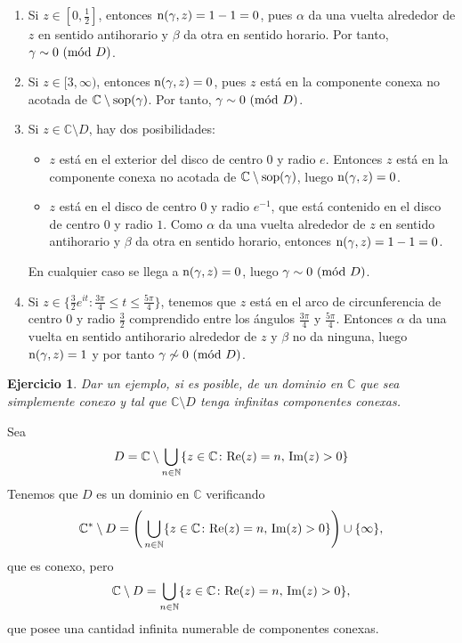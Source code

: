 \documentclass[11pt]{report}
\makeatletter
\renewenvironment{proof}[1][\proofname]{\par
  \pushQED{\qed}%
  \normalfont \topsep\z@skip %
  \trivlist
  \item[\hskip\labelsep
        \itshape
    #1\@addpunct{.}]\ignorespaces
}{%
  \popQED\endtrivlist\@endpefalse
}
\newcommand{\N}{\mathbb N}
\newcommand{\C}{\mathbb C}
\newtheorem{ejercicio}{Ejercicio}
\makeatother
\begin{document}
\begin{proof}
  \hfill
  \begin{enumerate}
    \item Si $z \in [0,\frac{1}{2}]$, entonces $\textup{n}(\gamma,z) = 1-1 = 0$, pues $\alpha$ da una vuelta alrededor de $z$ en sentido antihorario y $\beta$ da otra en sentido horario. Por tanto, $\gamma \sim 0 \ (\textup{mód } D)$.
    \item Si $z \in [3,\infty)$, entonces $\textup{n}(\gamma,z) = 0$, pues $z$ está en la componente conexa no acotada de $\C \setminus \textup{sop}(\gamma)$. Por tanto, $\gamma \sim 0 \ (\textup{mód } D)$.
    \item Si $z \in \C \setminus D$, hay dos posibilidades:
    \begin{itemize}
      \item $z$ está en el exterior del disco de centro $0$ y radio $e$. Entonces $z$ está en la componente conexa no acotada de $\C \setminus\textup{sop}(\gamma)$, luego $\textup{n}(\gamma,z) = 0$.
      \item $z$ está en el disco de centro $0$ y radio $e^{-1}$, que está contenido en el disco de centro $0$ y radio $1$. Como $\alpha$ da una vuelta alrededor de $z$ en sentido antihorario y $\beta$ da otra en sentido horario, entonces $\textup{n}(\gamma,z) = 1-1 = 0$.
    \end{itemize}
    En cualquier caso se llega a $\textup{n}(\gamma,z) =0$, luego $\gamma \sim 0 \ (\textup{mód } D)$.
    \item Si $z \in \{\frac{3}{2}e^{it} \colon \frac{3\pi}{4} \leq t \leq \frac{5\pi}{4}\}$, tenemos que $z$ está en el arco de circunferencia de centro $0$ y radio $\frac{3}{2}$ comprendido entre los ángulos $\frac{3\pi}{4}$ y $\frac{5\pi}{4}$. Entonces $\alpha$ da una vuelta en sentido antihorario alrededor de $z$ y $\beta$ no da ninguna, luego $\textup{n}(\gamma,z) = 1$ y por tanto $\gamma \not\sim 0 \ (\textup{mód } D)$. \qedhere
  \end{enumerate}
\end{proof}

\begin{ejercicio}
  Dar un ejemplo, si es posible, de un dominio en $\C$ que sea simplemente conexo y tal que $\C \setminus D$ tenga infinitas componentes conexas.
\end{ejercicio}

\begin{proof}
  Sea
  \[D = \C \setminus \bigcup_{n \in \N} \{z \in \C \colon \textup{Re}(z)=n, \, \textup{Im}(z)>0\}\]
  Tenemos que $D$ es un dominio en $\C$ verificando
  \[\C^* \setminus D = \left(\, \bigcup_{n \in \N} \{z \in \C \colon \textup{Re}(z)=n, \, \textup{Im}(z)>0\}\right)\cup \{\infty\} ,\]
  que es conexo, pero
  \[\C \setminus D = \bigcup_{n \in \N} \{z \in \C \colon \textup{Re}(z)=n, \, \textup{Im}(z)>0\},\]
  que posee una cantidad infinita numerable de componentes conexas.
\end{proof}
\end{document}
